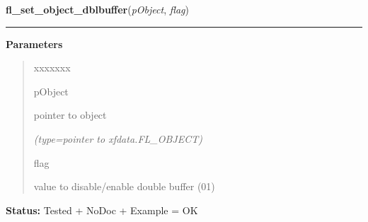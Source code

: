 \hspace{.8\funcindent}\begin{boxedminipage}{\funcwidth}

    \raggedright \textbf{fl\_set\_object\_dblbuffer}(\textit{pObject}, \textit{flag})

    \vspace{-1.5ex}

    \rule{\textwidth}{0.5\fboxrule}
\setlength{\parskip}{2ex}
\setlength{\parskip}{1ex}
      \textbf{Parameters}
      \vspace{-1ex}

      \begin{quote}
        \begin{Ventry}{xxxxxxx}

          \item[pObject]

          pointer to object

            {\it (type=pointer to xfdata.FL\_OBJECT)}

          \item[flag]

          value to disable/enable double buffer (0{\textbar}1)

        \end{Ventry}

      \end{quote}

\textbf{Status:} Tested + NoDoc + Example = OK



    \end{boxedminipage}

    \label{xformslib:library:fl_set_object_color}

    \vspace{0.5ex}

